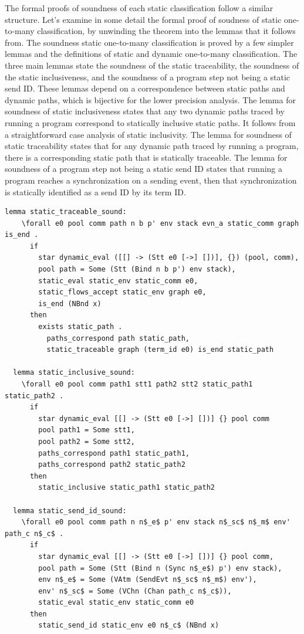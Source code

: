 \documentclass[10pt]{article}
\begin{document}
The formal proofs of soundness of each static classification follow a similar structure.
Let's examine in some detail the formal proof of soudness of static one-to-many classification,
by unwinding the theorem into the lemmas that it follows from.
The soundness static one-to-many classification is proved by a few simpler lemmas and the
definitions of static and dynamic one-to-many classification.  The three main lemmas state the
soundness of the static traceability, the soundness of the static inclusiveness, and
the soundness of a program step not being a static send ID. These lemmas depend on a
correspondence between static paths and dynamic paths, which is bijective for the lower
precision analysis. The lemma for soundness of static inclusiveness states that any two
dynamic paths traced by running a program correspond to statically inclusive static paths. It
follows from a straightforward case analysis of static inclusivity. The lemma for soundness of
static traceability states that for any dynamic path traced by running a program, there
is a corresponding static path that is statically traceable. The lemma for soundness of a
program step not being a static send ID states that running a program reaches a
synchronization on a sending event, then that synchronization is statically identified as a
send ID by its term ID.

\begin{lstlisting}[language=logic, mathescape]
  lemma static_traceable_sound:
    \forall e0 pool comm path n b p' env stack evn_a static_comm graph is_end .
      if
        star dynamic_eval ([[] -> (Stt e0 [->] [])], {}) (pool, comm), 
        pool path = Some (Stt (Bind n b p') env stack),
        static_eval static_env static_comm e0,
        static_flows_accept static_env graph e0,
        is_end (NBnd x)
      then
        exists static_path . 
          paths_correspond path static_path, 
          static_traceable graph (term_id e0) is_end static_path

  lemma static_inclusive_sound:
    \forall e0 pool comm path1 stt1 path2 stt2 static_path1 static_path2 . 
      if
        star dynamic_eval [[] -> (Stt e0 [->] [])] {} pool comm
        pool path1 = Some stt1, 
        pool path2 = Some stt2, 
        paths_correspond path1 static_path1, 
        paths_correspond path2 static_path2
      then
        static_inclusive static_path1 static_path2

  lemma static_send_id_sound:
    \forall e0 pool comm path n n$_e$ p' env stack n$_sc$ n$_m$ env' path_c n$_c$ .
      if
        star dynamic_eval [[] -> (Stt e0 [->] [])] {} pool comm, 
        pool path = Some (Stt (Bind n (Sync n$_e$) p') env stack), 
        env n$_e$ = Some (VAtm (SendEvt n$_sc$ n$_m$) env'), 
        env' n$_sc$ = Some (VChn (Chan path_c n$_c$)), 
        static_eval static_env static_comm e0
      then 
        static_send_id static_env e0 n$_c$ (NBnd x)
\end{lstlisting}
\end{document}

